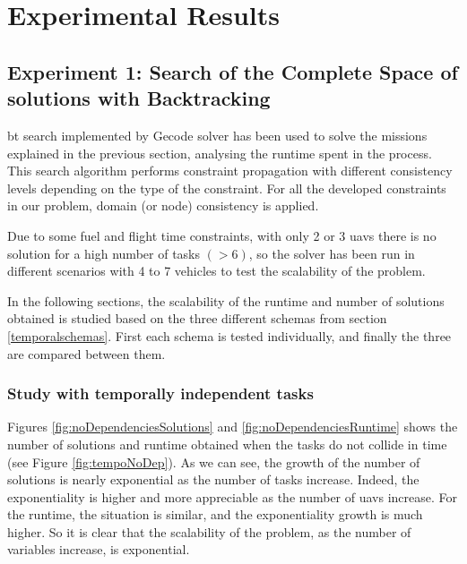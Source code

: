 
\chapter{Experimental Results} %
\label{Chapter5}

\section{Experiment 1: Search of the Complete Space of solutions with Backtracking}\label{experiment1}

\gls{bt} search implemented by Gecode solver has been used to solve the missions explained in the previous section, analysing the runtime spent in the process. This search algorithm performs constraint propagation with different consistency levels depending on the type of the constraint. For all the developed constraints in our problem, domain (or node) consistency is applied.

Due to some fuel and flight time constraints, with only 2 or 3 \glspl{uav} there is no solution for a high number of tasks $(> 6)$, so the solver has been run in different scenarios with 4 to 7 vehicles to test the scalability of the problem.

In the following sections, the scalability of the runtime and number of solutions obtained is studied based on the three different schemas from section \ref{temporalschemas}. First each schema is tested individually, and finally the three are compared between them.

\subsection{Study with temporally independent tasks}
Figures \ref{fig:noDependenciesSolutions} and \ref{fig:noDependenciesRuntime} shows the number of solutions and runtime obtained when the tasks do not collide in time (see Figure \ref{fig:tempoNoDep}). As we can see, the growth of the number of solutions is nearly exponential as the number of tasks increase. Indeed, the exponentiality is higher and more appreciable as the number of \glspl{uav} increase. For the runtime, the situation is similar, and the exponentiality growth is much higher. So it is clear that the scalability of the problem, as the number of variables increase, is exponential.

